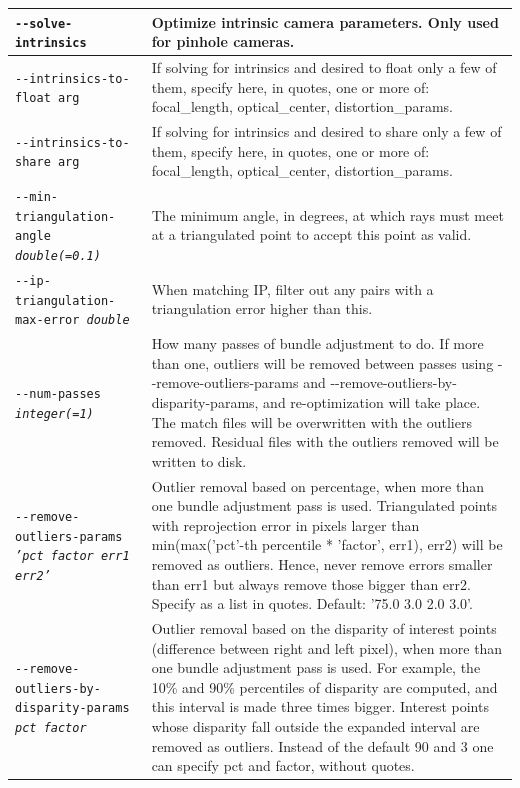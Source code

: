 \begin{longtable}{|p{8cm}|p{9cm}|}
\texttt{-\/-solve-intrinsics} & Optimize intrinsic camera parameters. Only used for pinhole cameras.\\ \hline

\texttt{-\/-intrinsics-to-float arg} & If solving for intrinsics and desired to float only a few of them, specify here, in quotes, one or more of: focal\_length, optical\_center, distortion\_params.\\ \hline

\texttt{-\/-intrinsics-to-share arg} & If solving for intrinsics and desired to share only a few of them, specify here, in quotes, one or more of: focal\_length, optical\_center, distortion\_params.\\ \hline

\texttt{-\/-min-triangulation-angle \textit{double(=0.1)}} &
The minimum angle, in degrees, at which rays must meet at a triangulated point to accept this point as valid.
\\ \hline

\texttt{-\/-ip-triangulation-max-error \textit{double}} &
When matching IP, filter out any pairs with a triangulation error higher than this.
\\ \hline

\texttt{-\/-num-passes \textit{integer(=1)}} &
How many passes of bundle adjustment to do. If more than one, outliers will be removed between passes using -\/-remove-outliers-params and -\/-remove-outliers-by-disparity-params, and re-optimization will take place. The match files will be overwritten with the outliers removed. Residual files with the outliers removed will be written to disk.
\\ \hline

\texttt{-\/-remove-outliers-params \textit{'pct factor err1 err2'}} &
Outlier removal based on percentage, when more than one bundle adjustment pass is used. Triangulated points with reprojection error in pixels larger than min(max('pct'-th percentile * 'factor', err1), err2) will be removed as outliers. Hence, never remove errors smaller than err1 but always remove those bigger than err2. Specify as a list in quotes. Default: '75.0 3.0 2.0 3.0'.\\ \hline

\texttt{-\/-remove-outliers-by-disparity-params \textit{pct factor}} &
Outlier removal based on the disparity of interest points (difference between right and left pixel), when more than one bundle adjustment pass is used. For example, the 10\% and 90\% percentiles of disparity are computed, and this interval is made three times bigger. Interest points whose disparity fall outside the expanded interval are removed as outliers. Instead of the default 90 and 3 one can specify pct and factor, without quotes.\\ \hline


\end{longtable}
